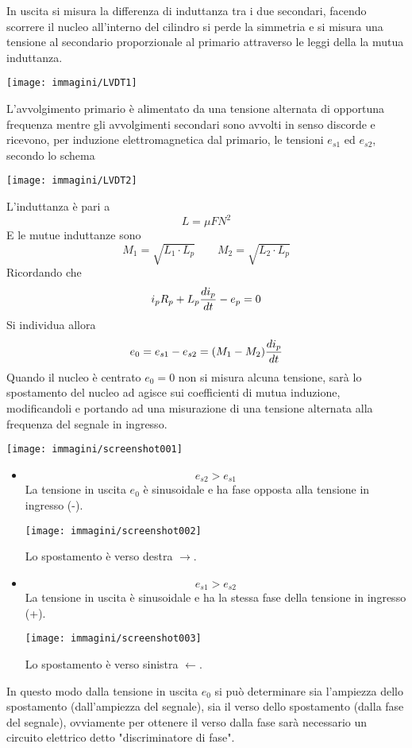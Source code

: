 \documentclass[a4paper, 15pt]{article}
\begin{document}
\begin{adjustwidth}{2in}{}
	In uscita si misura la differenza di induttanza tra i due secondari, facendo scorrere il nucleo all'interno del cilindro si perde la simmetria e si misura una tensione al secondario proporzionale al primario attraverso le leggi della la mutua induttanza. 	
	\begin{center}
		\texttt{[image: immagini/LVDT1]}
	\end{center}
	L’avvolgimento primario è alimentato da una tensione alternata di opportuna
	frequenza mentre gli avvolgimenti secondari sono avvolti in senso discorde e ricevono, per
	induzione elettromagnetica dal primario, le tensioni $e_{s1}$ ed $e_{s2}$, secondo lo schema 
	\begin{center}
		\texttt{[image: immagini/LVDT2]}
	\end{center}
	\newpage
	L'induttanza è pari a 
	\[L = \mu FN^2\]
	E le mutue induttanze sono
	\[M_1 = \sqrt{L_1\cdot L_p} \qquad M_2 = \sqrt{L_2\cdot L_p}\]
	Ricordando che 
	\[i_pR_p + L_p{di_p\over dt}-e_p = 0 \]
	Si individua allora 
	\[e_0 = e_{s1} - e_{s2} = (M_1-M_2){di_p\over dt}\]
	Quando il nucleo è centrato $e_0=0$ non si misura alcuna tensione, sarà lo spostamento del nucleo ad agisce sui coefficienti di mutua induzione, modificandoli e portando ad una misurazione di una tensione alternata alla frequenza del segnale in ingresso.
	\begin{center}
		\texttt{[image: immagini/screenshot001]}
	\end{center}
	\begin{itemize}
		\item \[e_{s2}>e_{s1}\]
		La tensione in uscita $e_0$ è sinusoidale e ha fase opposta alla tensione in ingresso (-).
		\begin{center}
			\texttt{[image: immagini/screenshot002]}
		\end{center}
		Lo spostamento è verso destra $\rightarrow$.
		
		\item \[e_{s1}>e_{s2}\]
		La tensione in uscita è sinusoidale e ha la stessa fase della tensione in ingresso (+).
		\begin{center}
			\texttt{[image: immagini/screenshot003]}
		\end{center}		
		Lo spostamento è verso sinistra $\leftarrow$. 		
	\end{itemize}
	In questo modo dalla tensione in uscita $e_0$ si può determinare sia l'ampiezza dello spostamento (dall'ampiezza del segnale), sia il verso dello spostamento (dalla fase del segnale), ovviamente per ottenere il verso dalla fase sarà necessario un circuito elettrico detto "discriminatore di fase".\newline 
	

\end{adjustwidth}
\end{document}
